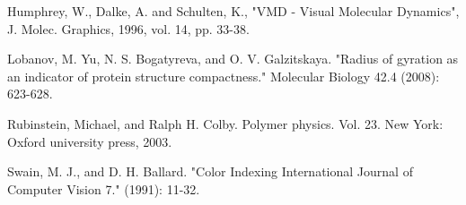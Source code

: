 \documentclass[12pt, onecolumn]{revtex4}    %
\begin{document}
\begin{thebibliography}{}
 Humphrey, W., Dalke, A. and Schulten, K., "VMD - Visual Molecular Dynamics", J. Molec. Graphics, 1996, vol. 14, pp. 33-38.

 Lobanov, M. Yu, N. S. Bogatyreva, and O. V. Galzitskaya. "Radius of gyration as an indicator of protein structure compactness." Molecular Biology 42.4 (2008): 623-628.

 Rubinstein, Michael, and Ralph H. Colby. Polymer physics. Vol. 23. New York: Oxford university press, 2003.

 Swain, M. J., and D. H. Ballard. "Color Indexing International Journal of Computer Vision 7." (1991): 11-32.

\end{thebibliography} 
\end{document}

